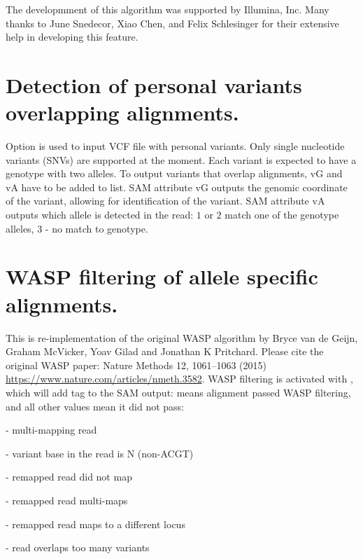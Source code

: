 \documentclass[12pt]{article}
\begin{document}
The developmment of this algorithm was supported by Illumina, Inc. 
Many thanks to June Snedecor, Xiao Chen, and Felix Schlesinger for their extensive help in developing this feature.

\section{Detection of personal variants overlapping alignments.}
Option   is used to input VCF file with personal variants. Only single nucleotide variants (SNVs) are supported at the moment. 
Each variant is expected to have a genotype with two alleles.
To output variants that overlap alignments, vG and vA have to be added to  list. 
SAM attribute vG outputs the genomic coordinate of the variant, allowing for identification of the variant.
SAM attribute vA outputs which allele is detected in the read: $1$ or $2$ match one of the genotype alleles, $3$ - no match to genotype.

\section{WASP filtering of allele specific alignments.}
This is re-implementation of the original WASP algorithm by Bryce van de Geijn, Graham McVicker, Yoav Gilad and Jonathan K Pritchard. Please cite the original WASP paper: Nature Methods 12, 1061–1063 (2015) \url{https://www.nature.com/articles/nmeth.3582}.
WASP filtering is activated with  , which will add  tag to the SAM output:
 means alignment passed WASP filtering, and all other values mean it did not pass:

 - multi-mapping read

 - variant base in the read is N (non-ACGT)

 - remapped read did not map

 - remapped read multi-maps

 - remapped read maps to a different locus

 - read overlaps too many variants
\end{document}
